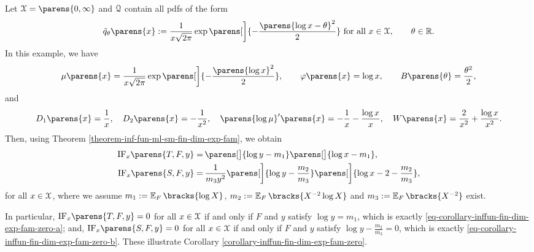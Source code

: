 \begin{example}[name=Lognormal location model]
	Let $\mathcal{X} = \parens{0, \infty}$ and $\mathcal{Q}$ contain all pdfs of the form 
	\begin{align*}
		\tilde{q}_{\theta} \parens{x} := \frac{1}{x \sqrt{2 \pi}} \exp \parens[\bigg]{- \frac{\parens{\log x - \theta}^2}{2}} \text{ for all } x \in \calX, \qquad \theta \in \Real. 
	\end{align*}
	In this example, we have 
	\begin{align*}
		\mu \parens{x} = \frac{1}{x \sqrt{2 \pi}} \exp \parens[\bigg]{- \frac{\parens{\log x}^2}{2}}, \qquad \varphi \parens{x} = \log x, \qquad B \parens{\theta} = \frac{\theta^2}{2}, 
	\end{align*}
	and 
	\begin{align*}
		D_1 \parens{x} = \frac{1}{x}, \quad D_2 \parens{x} = - \frac{1}{x^2}, \quad \parens{\log \mu}' \parens{x} = -\frac{1}{x} - \frac{\log x}{x}, \quad W \parens{x} = \frac{2}{x^2} + \frac{\log x}{x^2}. 
	\end{align*}
	Then, using Theorem \ref{theorem-inf-fun-ml-sm-fin-dim-exp-fam}, we obtain 
	\begin{align*}
		\mathrm{IF}_x \parens{T, F, y} = & \, \parens[\big]{\log y - m_1 } \parens[\big]{\log x - m_1 }, \\ 
		\mathrm{IF}_x \parens{S, F, y} = & \, \frac{1}{m_3 y^2} \parens[\bigg]{\log y - \frac{m_2}{m_3}} \parens[\bigg]{\log x - 2 - \frac{m_2}{m_3}}, 
	\end{align*}
	for all $x \in \mathcal{X}$, where we assume $m_1 := \E_F \bracks{\log X}$, $m_2 := \E_F \bracks{X^{-2} \log X}$ and $m_3 := \E_F \bracks{X^{-2}}$ exist. 
	
	In particular, $\mathrm{IF}_x \parens{T, F, y} = 0$ for all $x \in \mathcal{X}$ if and only if $F$ and $y$ satisfy $\log y = m_1$, which is exactly \eqref{eq-corollary-inffun-fin-dim-exp-fam-zero-a}; and, $\mathrm{IF}_x \parens{S, F, y} = 0$ for all $x \in \mathcal{X}$ if and only if $F$ and $y$ satisfy $\log y - \frac{m_2}{m_3} = 0$, which is exactly \eqref{eq-corollary-inffun-fin-dim-exp-fam-zero-b}. These illustrate Corollary \ref{corollary-inffun-fin-dim-exp-fam-zero}. 
	

\end{example}
